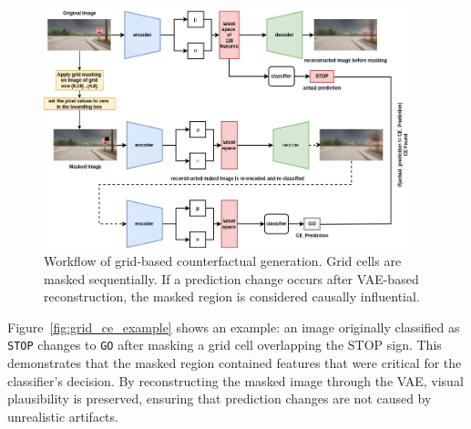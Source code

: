 \begin{figure}[htbp]
    \centering
    \includegraphics[width=0.95\textwidth]{img/masking/grid_based_masking/grid_based_masking_flow.drawio.png}
    \caption[Workflow of grid-based counterfactual generation]{Workflow of grid-based counterfactual generation. Grid cells are masked sequentially. If a prediction change occurs after VAE-based reconstruction, the masked region is considered causally influential.}
    \label{fig:grid_masking_diagram}
\end{figure}

Figure~\ref{fig:grid_ce_example} shows an example: an image originally classified as \texttt{STOP} changes to \texttt{GO} after masking a grid cell overlapping the STOP sign. This demonstrates that the masked region contained features that were critical for the classifier's decision. By reconstructing the masked image through the VAE, visual plausibility is preserved, ensuring that prediction changes are not caused by unrealistic artifacts.

